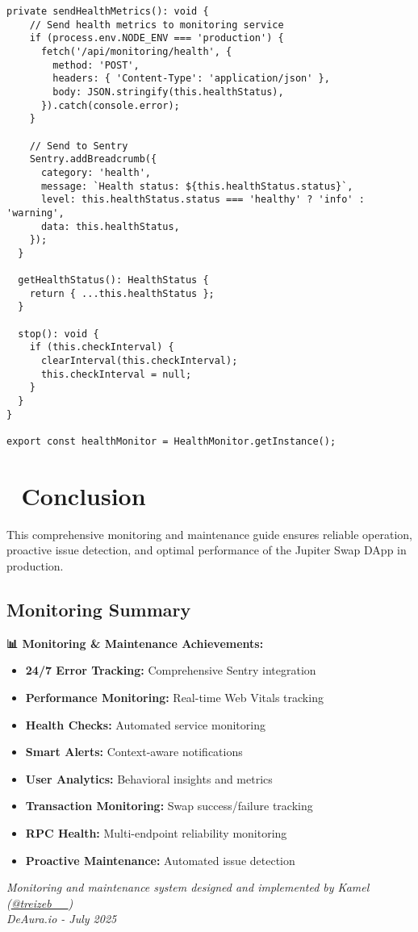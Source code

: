 \documentclass[11pt,a4paper]{article}
\begin{document}
\begin{lstlisting}[style=javascript, caption=Comprehensive Health Monitoring System]
  private sendHealthMetrics(): void {
    // Send health metrics to monitoring service
    if (process.env.NODE_ENV === 'production') {
      fetch('/api/monitoring/health', {
        method: 'POST',
        headers: { 'Content-Type': 'application/json' },
        body: JSON.stringify(this.healthStatus),
      }).catch(console.error);
    }
    
    // Send to Sentry
    Sentry.addBreadcrumb({
      category: 'health',
      message: `Health status: ${this.healthStatus.status}`,
      level: this.healthStatus.status === 'healthy' ? 'info' : 'warning',
      data: this.healthStatus,
    });
  }
  
  getHealthStatus(): HealthStatus {
    return { ...this.healthStatus };
  }
  
  stop(): void {
    if (this.checkInterval) {
      clearInterval(this.checkInterval);
      this.checkInterval = null;
    }
  }
}

export const healthMonitor = HealthMonitor.getInstance();
\end{lstlisting}

\section{🎯 Conclusion}

This comprehensive monitoring and maintenance guide ensures reliable operation, proactive issue detection, and optimal performance of the Jupiter Swap DApp in production.

\subsection{Monitoring Summary}

\begin{tcolorbox}[colback=successGreen!10,colframe=successGreen]
\textbf{📊 Monitoring \& Maintenance Achievements:}
\begin{itemize}
    \item \textbf{24/7 Error Tracking:} Comprehensive Sentry integration
    \item \textbf{Performance Monitoring:} Real-time Web Vitals tracking
    \item \textbf{Health Checks:} Automated service monitoring
    \item \textbf{Smart Alerts:} Context-aware notifications
    \item \textbf{User Analytics:} Behavioral insights and metrics
    \item \textbf{Transaction Monitoring:} Swap success/failure tracking
    \item \textbf{RPC Health:} Multi-endpoint reliability monitoring
    \item \textbf{Proactive Maintenance:} Automated issue detection
\end{itemize}
\end{tcolorbox}

\vspace{1cm}

\begin{center}
\textit{Monitoring and maintenance system designed and implemented by Kamel (\href{https://x.com/treizeb__}{@treizeb\_\_})\\
DeAura.io - July 2025}
\end{center}
\end{document}
